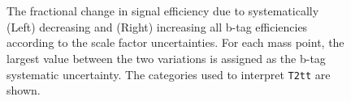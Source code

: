 \begin{figure}[h!]
  \begin{center}
    \\
    \\
    \caption{\label{fig:sms-btag-t2tt}The fractional change in signal
      efficiency due to systematically (Left) decreasing and (Right)
      increasing all b-tag efficiencies according to the scale factor
      uncertainties. For each mass point, the largest value between the 
      two variations is assigned as the b-tag systematic uncertainty. 
      The categories used to interpret \texttt{T2tt} are shown.}
  \end{center}
\end{figure}

